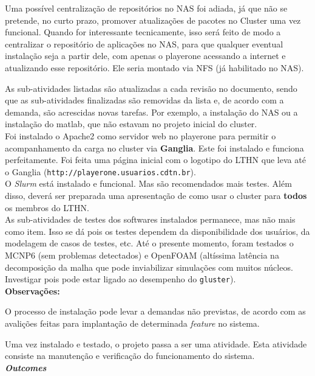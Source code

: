Uma possível centralização de repositórios no NAS foi adiada, já que não se pretende, no curto prazo, promover atualizações de pacotes no Cluster uma vez 
funcional. Quando for interessante tecnicamente, isso será feito de modo a centralizar o repositório de aplicações no NAS, para que qualquer eventual instalação seja a partir dele, com apenas o playerone acessando a internet e atualizando esse repositório. Ele seria montado via NFS (já habilitado no NAS).

As sub-atividades listadas são atualizadas a cada revisão no documento, sendo que 
as sub-atividades finalizadas são removidas da lista e, de acordo com a demanda, 
são acrescidas novas tarefas. Por exemplo, a instalação do NAS ou a instalação do 
matlab, que não estavam no projeto inicial do cluster.\\

Foi instalado o Apache2 como servidor web no playerone para permitir o acompanhamento da carga no cluster via \textbf{Ganglia}. Este foi instalado 
e funciona perfeitamente. Foi feita uma página inicial com o logotipo do LTHN 
que leva até o Ganglia (\texttt{http://playerone.usuarios.cdtn.br}).\\

O \textit{Slurm} está instalado e funcional. Mas são recomendados mais testes. 
Além disso, deverá ser preparada uma apresentação de como usar o cluster 
para \textbf{todos} os membros do LTHN.\\

As sub-atividades de testes dos softwares instalados permanece, mas não mais como item. Isso se dá pois os testes dependem da disponibilidade dos usuários, da modelagem de casos de testes, etc. Até o presente momento, foram testados o MCNP6 (sem problemas detectados) e OpenFOAM (altíssima latência na decomposição da malha que pode inviabilizar simulações com muitos núcleos. Investigar pois pode estar ligado ao desempenho do \texttt{gluster}).\\

\textbf{Observações:}

O processo de instalação pode levar a demandas não previstas, de acordo com as avalições feitas para implantação de determinada \textit{feature} no sistema.

Uma vez instalado e testado, o projeto passa a ser uma atividade. Esta atividade 
consiste na manutenção e verificação do funcionamento do sistema.\\

\textbf{\textit{Outcomes}}

